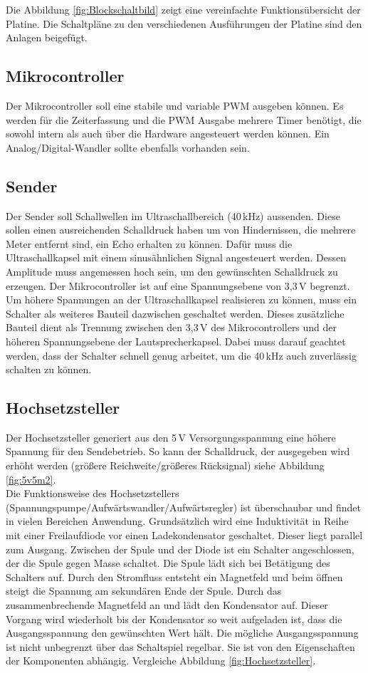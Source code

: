 Die Abbildung \ref{fig:Blockschaltbild} zeigt eine vereinfachte Funktionsübersicht der Platine. Die Schaltpläne zu den verschiedenen Ausführungen der Platine sind den Anlagen beigefügt.

\subsection{Mikrocontroller}
Der Mikrocontroller soll eine stabile und variable PWM ausgeben können. Es werden für die Zeiterfassung und die PWM Ausgabe mehrere Timer benötigt, die sowohl intern als auch über die Hardware angesteuert werden können. Ein Analog/Digital-Wandler sollte ebenfalls vorhanden sein.

\subsection{Sender}
Der Sender soll Schallwellen im Ultraschallbereich (40\,kHz) aussenden. Diese sollen einen ausreichenden Schalldruck haben um von Hindernissen, die mehrere Meter entfernt sind, ein Echo erhalten zu können. Dafür muss die Ultraschallkapsel mit einem sinusähnlichen Signal angesteuert werden. Dessen Amplitude muss angemessen hoch sein, um den gewünschten Schalldruck zu erzeugen. Der Mikrocontroller ist auf eine Spannungsebene von 3,3\,V begrenzt. Um höhere Spannungen an der Ultraschallkapsel realisieren zu können, muss ein Schalter als weiteres Bauteil dazwischen geschaltet werden. Dieses zusätzliche Bauteil dient als Trennung zwischen den 3,3\,V des Mikrocontrollers und der höheren Spannungsebene der Lautsprecherkapsel. Dabei muss darauf geachtet werden, dass der Schalter schnell genug arbeitet, um die 40\,kHz auch zuverlässig schalten zu können.

\subsection{Hochsetzsteller}
Der Hochsetzsteller generiert aus den 5\,V Versorgungsspannung eine höhere Spannung für den Sendebetrieb. So kann der Schalldruck, der ausgegeben wird erhöht werden (größere Reichweite/größeres Rücksignal) siehe Abbildung \ref{fig:5v5m2}.\\
Die Funktionsweise des Hochsetzstellers (Spannungspumpe/Aufwärtswandler/Aufwärtsregler) ist überschaubar und findet in vielen Bereichen Anwendung. Grundsätzlich wird eine Induktivität in Reihe mit einer Freilaufdiode vor einen Ladekondensator geschaltet. Dieser liegt parallel zum Ausgang. Zwischen der Spule und der Diode ist ein Schalter angeschlossen, der die Spule gegen Masse schaltet. Die Spule lädt sich bei Betätigung des Schalters auf. Durch den Stromfluss entsteht ein Magnetfeld und beim öffnen steigt die Spannung am sekundären Ende der Spule. Durch das zusammenbrechende Magnetfeld an und lädt den Kondensator auf. Dieser Vorgang wird wiederholt bis der Kondensator so weit aufgeladen ist, dass die Ausgangsspannung den gewünschten Wert hält. Die mögliche Ausgangsspannung ist nicht unbegrenzt über das Schaltspiel regelbar. Sie ist von den Eigenschaften der Komponenten abhängig. Vergleiche Abbildung \ref{fig:Hochsetzsteller}.

